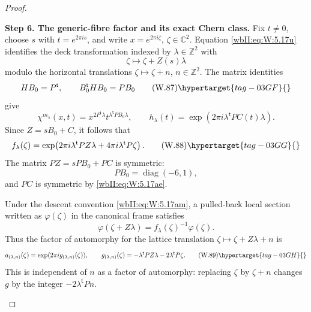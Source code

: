 \begin{proof}
\begin{enumerate}[label={$\langle1\rangle$\arabic*.},leftmargin=*]
\noindent\textbf{Step 6. The generic-fibre factor and its exact Chern class.}
Fix \(t\ne0\), choose \(s\) with \(t=e^{2\pi i s}\), and write
\(x=e^{2\pi i\zeta}\), \(\zeta\in\mathbb C^2\).
Equation \eqref{wbII:eq:W:5.17u} identifies the deck transformation indexed by
\(\lambda\in\mathbb Z^2\) with
\[
 \zeta\longmapsto\zeta+Z(s)\lambda
\]
modulo the horizontal translations
\(\zeta\mapsto\zeta+n\), \(n\in\mathbb Z^2\).  The matrix identities
\[
 HB_0=P^{\mathsf t},
 \qquad
 B_0^{\mathsf t}HB_0=PB_0
\tag{W.87}\hypertarget{tag-03GF}{}\label{wbII:eq:W:5.17at}
\]
give
\[
 \chi^{m_\lambda}(x,t)
 =x^{2P^{\mathsf t}\lambda}
  t^{\lambda^{\mathsf t}PB_0\lambda},
\qquad
 h_\lambda(t)
 =\exp(2\pi i\lambda^{\mathsf t}PC(t)\lambda).
\]
Since \(Z=sB_0+C\), it follows that
\[
 f_\lambda(\zeta)
 =\exp\!\left(
 2\pi i\lambda^{\mathsf t}PZ\lambda+
 4\pi i\lambda^{\mathsf t}P\zeta\right).
\tag{W.88}\hypertarget{tag-03GG}{}\label{wbII:eq:W:5.17au}
\]
The matrix \(PZ=sPB_0+PC\) is symmetric:
\[
 PB_0=\operatorname{diag}(-6,1),
\]
and \(PC\) is symmetric by \eqref{wbII:eq:W:5.17ae}.

Under the descent convention \eqref{wbII:eq:W:5.17am}, a pulled-back local section
written as \(\varphi(\zeta)\) in the canonical frame satisfies
\[
 \varphi(\zeta+Z\lambda)
 =f_\lambda(\zeta)^{-1}\varphi(\zeta).
\]
Thus the factor of automorphy for the lattice translation
\(\zeta\mapsto\zeta+Z\lambda+n\) is
\[
 a_{(\lambda,n)}(\zeta)
 =\exp(2\pi i g_{(\lambda,n)}(\zeta)),
\qquad
 g_{(\lambda,n)}(\zeta)
 =-\lambda^{\mathsf t}PZ\lambda
  -2\lambda^{\mathsf t}P\zeta.
\tag{W.89}\hypertarget{tag-03GH}{}\label{wbII:eq:W:5.17av}
\]
This is independent of \(n\) as a factor of automorphy: replacing
\(\zeta\) by \(\zeta+n\) changes \(g\) by the integer
\(-2\lambda^{\mathsf t}Pn\).


\end{enumerate}
\end{proof}
